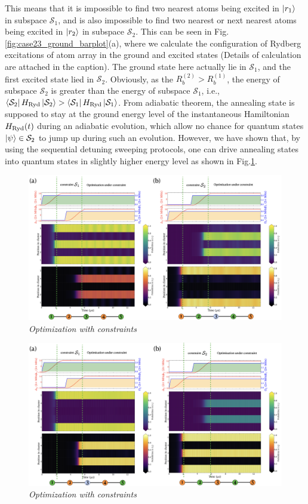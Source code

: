 \documentclass[%
 reprint,
nofootinbib,
 amsmath,amssymb,
 aps,
pra,
floatfix,
]{revtex4-2}
\begin{document}
This means that it is impossible to find two nearest atoms being excited in $\ket{r_1}$ in subspace $\mathcal{S}_1$, and is also impossible to find two nearest or next nearest atoms being excited in $\ket{r_2}$ in subspace $\mathcal{S}_2$. This can be seen in Fig.\ref{fig:case23_ground_barplot}(a), where we calculate the configuration of Rydberg excitations of atom array in the ground and excited states (Details of calculation are attached in the caption). The ground state here actually lie in $\mathcal{S}_1$, and the first excited state lied in $\mathcal{S}_2$. Obviously, as the $R^{(2)}_b > R^{(1)}_b$, the energy of subspace $\mathcal{S}_2$ is greater than the energy of subspace $\mathcal{S}_1$, i.e., $\bra{\mathcal{S}_2}H_{\rm Ryd}\ket{\mathcal{S}_2} > \bra{\mathcal{S}_1}H_{\rm Ryd}\ket{\mathcal{S}_1}$. From adiabatic theorem, the annealing state is supposed to stay at the ground energy level of the instantaneous Hamiltonian $H_{\rm Ryd}(t)$ during an adiabatic evolution, which allow no chance for quantum states $\ket{\psi} \in \mathcal{S}_2$ to jump up during such an evolution. However, we have shown that, by using the sequential detuning sweeping protocols, one can drive annealing states into quantum states in slightly higher energy level as shown in Fig.\ref{fig:case2_opt}.

\begin{figure}[ht!]
    \centering
    \includegraphics[width=15cm]{picture/case2_QOconstraint1.png}
    \caption{\textit{Optimization with constraints}}
    \label{fig:case2_opt}
\end{figure}


\begin{figure}[ht!]
    \centering
    \includegraphics[width=14cm]{picture/case3_QOconstraint1.png}
    \caption{\textit{Optimization with constraints}}
    \label{fig:case3_opt}
\end{figure}
\end{document}
